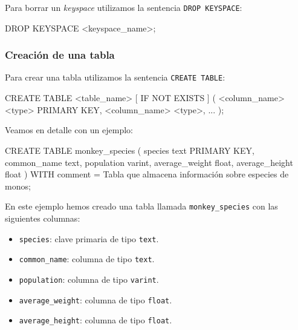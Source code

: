 \documentclass[
]{book}
\newenvironment{Shaded}{}{}
\newcommand{\NormalTok}[1]{#1}
\providecommand{\tightlist}{%
  \setlength{\itemsep}{0pt}\setlength{\parskip}{0pt}}
\begin{document}
Para borrar un \emph{keyspace} utilizamos la sentencia \texttt{DROP\ KEYSPACE}:

\begin{Shaded}
\begin{Highlighting}[]
\NormalTok{DROP KEYSPACE \textless{}keyspace\_name\textgreater{};}
\end{Highlighting}
\end{Shaded}

\subsubsection{Creación de una tabla}\label{creaciuxf3n-de-una-tabla}

Para crear una tabla utilizamos la sentencia \texttt{CREATE\ TABLE}:

\begin{Shaded}
\begin{Highlighting}[]
\NormalTok{CREATE TABLE \textless{}table\_name\textgreater{} [     IF NOT EXISTS ] (}
\NormalTok{  \textless{}column\_name\textgreater{} \textless{}type\textgreater{} PRIMARY KEY,}
\NormalTok{  \textless{}column\_name\textgreater{} \textless{}type\textgreater{},}
\NormalTok{  ...}
\NormalTok{);}
\end{Highlighting}
\end{Shaded}

Veamos en detalle con un ejemplo:

\begin{Shaded}
\begin{Highlighting}[]
\NormalTok{CREATE TABLE monkey\_species (}
\NormalTok{    species text PRIMARY KEY,}
\NormalTok{    common\_name text,}
\NormalTok{    population varint,}
\NormalTok{    average\_weight float,}
\NormalTok{    average\_height float}
\NormalTok{) WITH comment = \textquotesingle{}Tabla que almacena información sobre especies de monos\textquotesingle{};}
\end{Highlighting}
\end{Shaded}

En este ejemplo hemos creado una tabla llamada \texttt{monkey\_species} con las siguientes columnas:

\begin{itemize}
\tightlist
\item
  \texttt{species}: clave primaria de tipo \texttt{text}.
\item
  \texttt{common\_name}: columna de tipo \texttt{text}.
\item
  \texttt{population}: columna de tipo \texttt{varint}.
\item
  \texttt{average\_weight}: columna de tipo \texttt{float}.
\item
  \texttt{average\_height}: columna de tipo \texttt{float}.
\end{itemize}
\end{document}
